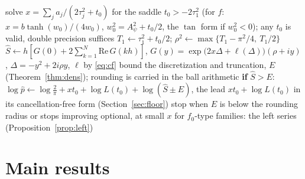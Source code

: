 \documentclass[11pt]{article}
\theoremstyle{definition}
\newcommand{\fz}{f_0}
\begin{document}
\begin{algorithm}[H]
\caption{Log density with an enclosure, family $(a_j,\tau_j)$, point $x>0$}\label{alg:dens}
\begin{algorithmic}[1]
\State solve $x=\sum_ja_j/(2\tau_j^2+t_0)$ for the saddle $t_0>-2\tau_1^2$ (for $f$: $x=b\tanh(w_0)/(4w_0)$,
$w_0^2=A_\psi^2+t_0/2$, the $\tan$ form if $w_0^2<0$); any $t_0$ is valid, double precision suffices
\State $T_1\gets\tau_1^2+t_0/2$; $\rho^2\gets\max\{T_1-\pi^2/4,\ T_1/2\}$ 
   \State $\hat S\gets h[G(0)+2\sum_{k=1}^N\mathrm{Re}\,G(kh)]$, $G(y)=\exp\bigl(2x\Delta+\ell(\Delta)\bigr)(\rho+iy)$,
   $\Delta=-y^2+2i\rho y$, $\ell$ by \eqref{eq:cf}
   \State bound the discretization and truncation, $E$ (Theorem~\ref{thm:dens}); rounding is carried in the ball
   arithmetic
   \State \textbf{if} $\hat S>E$: $\log\hat p\gets\log\frac2\pi+xt_0+\log L(t_0)+\log(\hat S\pm E)$, the lead
   $xt_0+\log L(t_0)$ in its cancellation-free form (Section~\ref{sec:floor})
   \State stop when $E$ is below the rounding radius or stops improving
\EndFor
\State optional, at small $x$ for $\fz$-type families: the left series (Proposition~\ref{prop:left})
\end{algorithmic}
\end{algorithm}

\clearpage
\section{Main results}\label{sec:main}
\end{document}
